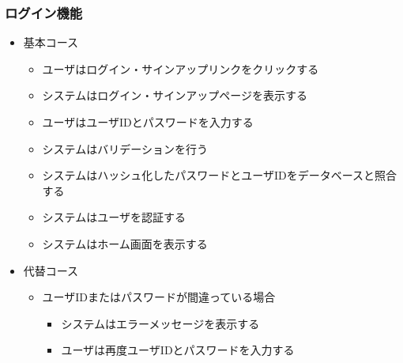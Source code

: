 \documentclass{ltjsarticle}
\begin{document}
\subsubsection{ログイン機能}
\begin{itemize}
  \item 基本コース
  \begin{itemize}
    \item ユーザはログイン・サインアップリンクをクリックする
    \item システムはログイン・サインアップページを表示する
    \item ユーザはユーザIDとパスワードを入力する
    \item システムはバリデーションを行う
    \item システムはハッシュ化したパスワードとユーザIDをデータベースと照合する
    \item システムはユーザを認証する
    \item システムはホーム画面を表示する
  \end{itemize}
  \item 代替コース
  \begin{itemize}
    \item ユーザIDまたはパスワードが間違っている場合
    \begin{itemize}
      \item システムはエラーメッセージを表示する
      \item ユーザは再度ユーザIDとパスワードを入力する
    \end{itemize}
  \end{itemize}
\end{itemize}
\end{document}
